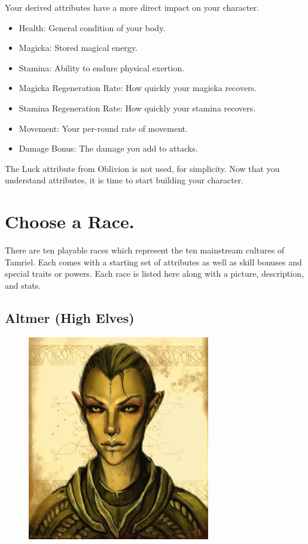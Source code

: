 \documentclass[12pt]{book}
\begin{document}
\noindent
Your derived attributes have a more direct impact on your character.
\begin{itemize}
	\item Health: General condition of your body.
	\item Magicka: Stored magical energy.
	\item Stamina: Ability to endure physical exertion.
	\item Magicka Regeneration Rate: How quickly your magicka recovers.
	\item Stamina Regeneration Rate: How quickly your stamina recovers.
	\item Movement: Your per-round rate of movement.
	\item Damage Bonus: The damage you add to attacks.
\end{itemize}
The Luck attribute from Oblivion is not used, for simplicity. Now that you understand attributes, it is time to start building your character.\\

\section{Choose a Race.}
There are ten playable races which represent the ten mainstream cultures of Tamriel. Each comes with a starting set of attributes as well as skill bonuses and special traits or powers. Each race is listed here along with a picture, description, and stats.\\

\subsection{Altmer (High Elves)}
\begin{figure}
	\includegraphics[width=\textwidth]{Altmer.png}
\end{figure}
\end{document}

